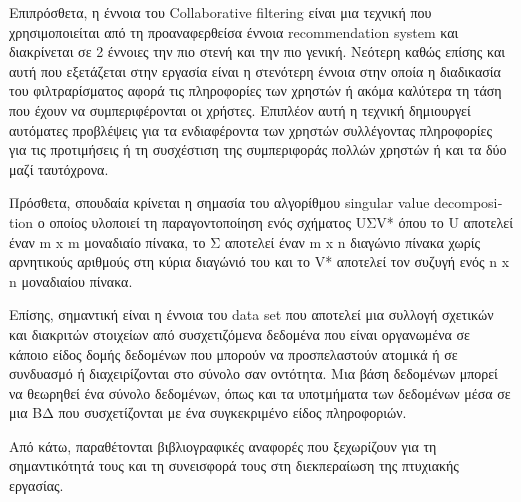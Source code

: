 \documentclass{report}
\begin{document}
Επιπρόσθετα, η έννοια του \textlatin{Collaborative filtering} είναι μια τεχνική που χρησιμοποιείται από τη προαναφερθείσα έννοια \textlatin{recommendation system} και διακρίνεται σε 2 έννοιες την πιο στενή και την πιο γενική. Νεότερη καθώς επίσης και αυτή που εξετάζεται στην εργασία είναι η στενότερη έννοια στην οποία η διαδικασία του φιλτραρίσματος αφορά τις πληροφορίες των χρηστών ή ακόμα καλύτερα τη τάση που έχουν να συμπεριφέρονται οι χρήστες. Επιπλέον αυτή η τεχνική δημιουργεί αυτόματες προβλέψεις για τα ενδιαφέροντα των χρηστών συλλέγοντας πληροφορίες για τις προτιμήσεις ή τη συσχέστιση της συμπεριφοράς πολλών χρηστών ή και τα δύο μαζί ταυτόχρονα.

Πρόσθετα, σπουδαία κρίνεται η σημασία του αλγορίθμου \textlatin{singular value decomposition} ο οποίος υλοποιεί τη παραγοντοποίηση ενός σχήματος \textlatin{U}Σ\textlatin{V}*  όπου το \textlatin{U} αποτελεί έναν \textlatin{m x m} μοναδιαίο πίνακα, το \textlatin{Σ} αποτελεί έναν \textlatin{m x n} διαγώνιο πίνακα χωρίς αρνητικούς αριθμούς στη κύρια διαγώνιό του και το \textlatin{V}* αποτελεί τον συζυγή ενός \textlatin{n x n} μοναδιαίου πίνακα.
 
Επίσης, σημαντική είναι η έννοια του \textlatin{data set} που αποτελεί μια συλλογή  σχετικών και διακριτών στοιχείων από συσχετιζόμενα δεδομένα που είναι οργανωμένα σε κάποιο είδος δομής δεδομένων που μπορούν να προσπελαστούν ατομικά ή σε συνδυασμό ή διαχειρίζονται στο σύνολο σαν οντότητα.  Μια βάση δεδομένων μπορεί να θεωρηθεί ένα σύνολο δεδομένων, όπως και τα υποτμήματα των δεδομένων μέσα σε μια ΒΔ που συσχετίζονται με ένα συγκεκριμένο είδος πληροφοριών.
 
Από κάτω, παραθέτονται βιβλιογραφικές  αναφορές που ξεχωρίζουν για τη σημαντικότητά τους και τη συνεισφορά τους στη διεκπεραίωση της πτυχιακής εργασίας.
\end{document}
